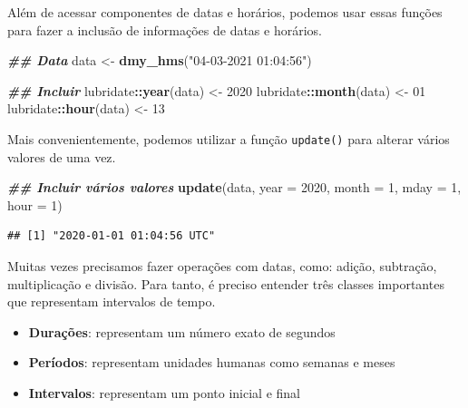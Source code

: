 \documentclass[
]{article}
\newenvironment{Shaded}{\begin{snugshade}}{\end{snugshade}}
\newcommand{\AttributeTok}[1]{\textcolor[rgb]{0.13,0.29,0.53}{#1}}
\newcommand{\DecValTok}[1]{\textcolor[rgb]{0.00,0.00,0.81}{#1}}
\newcommand{\DocumentationTok}[1]{\textcolor[rgb]{0.56,0.35,0.01}{\textbf{\textit{#1}}}}
\newcommand{\FunctionTok}[1]{\textcolor[rgb]{0.13,0.29,0.53}{\textbf{#1}}}
\newcommand{\NormalTok}[1]{#1}
\newcommand{\OtherTok}[1]{\textcolor[rgb]{0.56,0.35,0.01}{#1}}
\newcommand{\SpecialCharTok}[1]{\textcolor[rgb]{0.81,0.36,0.00}{\textbf{#1}}}
\newcommand{\StringTok}[1]{\textcolor[rgb]{0.31,0.60,0.02}{#1}}
\providecommand{\tightlist}{%
  \setlength{\itemsep}{0pt}\setlength{\parskip}{0pt}}
\begin{document}
Além de acessar componentes de datas e horários, podemos usar essas funções para fazer a inclusão de informações de datas e horários.

\begin{Shaded}
\begin{Highlighting}[]
\DocumentationTok{\#\# Data}
\NormalTok{data }\OtherTok{\textless{}{-}} \FunctionTok{dmy\_hms}\NormalTok{(}\StringTok{"04{-}03{-}2021 01:04:56"}\NormalTok{)}

\DocumentationTok{\#\# Incluir}
\NormalTok{lubridate}\SpecialCharTok{::}\FunctionTok{year}\NormalTok{(data) }\OtherTok{\textless{}{-}} \DecValTok{2020}
\NormalTok{lubridate}\SpecialCharTok{::}\FunctionTok{month}\NormalTok{(data) }\OtherTok{\textless{}{-}} \DecValTok{01}
\NormalTok{lubridate}\SpecialCharTok{::}\FunctionTok{hour}\NormalTok{(data) }\OtherTok{\textless{}{-}} \DecValTok{13}
\end{Highlighting}
\end{Shaded}

Mais convenientemente, podemos utilizar a função \texttt{update()} para alterar vários valores de uma vez.

\begin{Shaded}
\begin{Highlighting}[]
\DocumentationTok{\#\# Incluir vários valores}
\FunctionTok{update}\NormalTok{(data, }\AttributeTok{year =} \DecValTok{2020}\NormalTok{, }\AttributeTok{month =} \DecValTok{1}\NormalTok{, }\AttributeTok{mday =} \DecValTok{1}\NormalTok{, }\AttributeTok{hour =} \DecValTok{1}\NormalTok{)}
\end{Highlighting}
\end{Shaded}

\begin{verbatim}
## [1] "2020-01-01 01:04:56 UTC"
\end{verbatim}

Muitas vezes precisamos fazer operações com datas, como: adição, subtração, multiplicação e divisão. Para tanto, é preciso entender três classes importantes que representam intervalos de tempo.

\begin{itemize}
\tightlist
\item
  \textbf{Durações}: representam um número exato de segundos
\item
  \textbf{Períodos}: representam unidades humanas como semanas e meses
\item
  \textbf{Intervalos}: representam um ponto inicial e final
\end{itemize}
\end{document}

